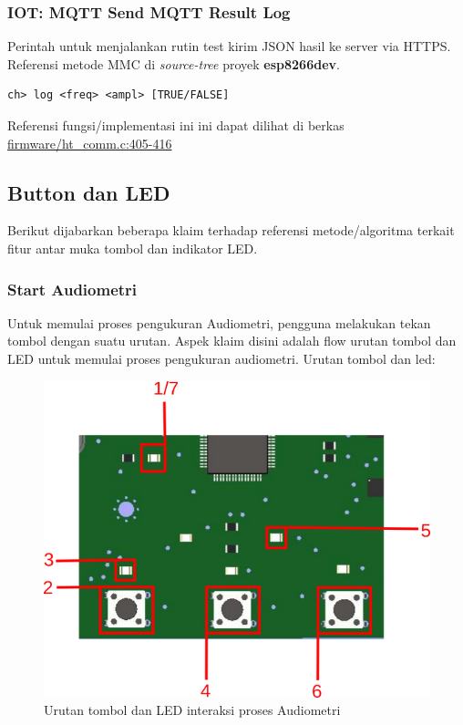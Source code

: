 \documentclass[12pt,]{article}
\begin{document}
	\subsubsection{IOT: MQTT Send MQTT Result Log}
	Perintah untuk menjalankan rutin test kirim JSON hasil ke server via HTTPS.
	Referensi metode MMC di \textit{source-tree} proyek \textbf{esp8266dev}.
	\begin{verbatim}
ch> log <freq> <ampl> [TRUE/FALSE]
	\end{verbatim}
	
	Referensi fungsi/implementasi ini ini dapat dilihat di berkas
	\href{https://github.com/VibrasticLab/pikoakustik/blob/stm32f401re_3pin/firmware/ht_comm.c#L405-L416}{firmware/ht\_comm.c:405-416}

	\subsection{Button dan LED}
	
	Berikut dijabarkan beberapa klaim terhadap referensi metode/algoritma terkait fitur antar muka tombol dan indikator LED.
	
	\subsubsection{Start Audiometri}
	
	Untuk memulai proses pengukuran Audiometri, pengguna melakukan tekan tombol dengan suatu urutan.
	Aspek klaim disini adalah flow urutan tombol dan LED untuk memulai proses pengukuran audiometri.
	Urutan tombol dan led:
	
	\begin{figure}[!ht]
		\centering
		\includegraphics[width=350pt]{images/ledbutton_step}
		\caption{Urutan tombol dan LED interaksi proses Audiometri}
	\end{figure}
\end{document}
